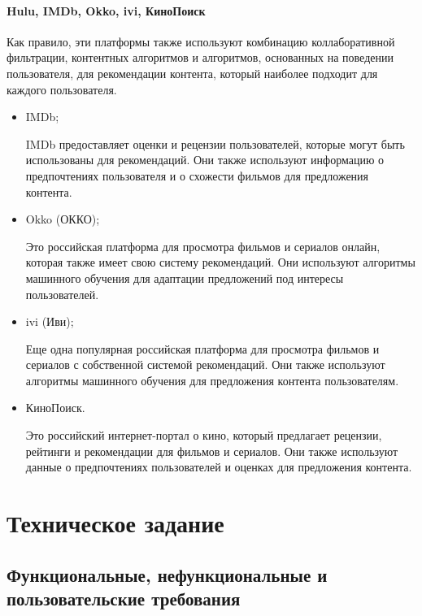 \paragraph{Hulu, IMDb, Okko, ivi, КиноПоиск}

Как правило, эти платформы также используют комбинацию коллаборативной фильтрации, контентных алгоритмов и алгоритмов,
основанных на поведении пользователя, для рекомендации контента, который наиболее подходит для каждого пользователя.

\begin{itemize}
	\item IMDb; \par
	IMDb предоставляет оценки и рецензии пользователей, которые могут быть использованы для рекомендаций.
	Они также используют информацию о предпочтениях пользователя и о схожести фильмов для предложения контента.

	\item Okko (ОККО); \par
	Это российская платформа для просмотра фильмов и сериалов онлайн, которая также имеет свою систему рекомендаций.
	Они используют алгоритмы машинного обучения для адаптации предложений под интересы пользователей.

	\item ivi (Иви);\par
	Еще одна популярная российская платформа для просмотра фильмов и сериалов с собственной системой рекомендаций.
	Они также используют алгоритмы машинного обучения для предложения контента пользователям.

	\item КиноПоиск.\par
	Это российский интернет-портал о кино, который предлагает рецензии, рейтинги и рекомендации для фильмов и сериалов.
	Они также используют данные о предпочтениях пользователей и оценках для предложения контента.
\end{itemize}
\clearpage

\clearpage  %

\section{Техническое задание}

\subsection{Функциональные, нефункциональные и пользовательские требования}

